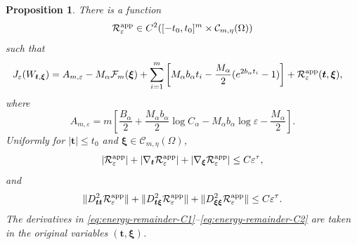 \documentclass[11pt]{article}
\newtheorem{proposition}[theorem]{Proposition}
\numberwithin{equation}{section}
\begin{document}
\begin{proposition}\label{prop:energy-expansion}
There is a function
\[
\mathcal R_\varepsilon^{\rm app}
\in C^2([-t_0,t_0]^m\times\mathcal C_{m,\eta}(\Omega))
\]
such that
\begin{equation}\label{eq:energy-expansion}
\begin{aligned}
J_\varepsilon(W_{\boldsymbol t,\boldsymbol\xi})
={}&A_{m,\varepsilon}-M_\alpha\mathcal F_m(\boldsymbol\xi)+\sum_{i=1}^{m}\left[
M_\alpha b_\alpha t_i
-\frac{M_\alpha}{2}(e^{2b_\alpha t_i}-1)
\right]
+\mathcal R_\varepsilon^{\rm app}(\boldsymbol t,\boldsymbol\xi),
\end{aligned}
\end{equation}
where
\begin{equation}\label{eq:energy-constant}
A_{m,\varepsilon}
=m\left[
\frac{B_\alpha}{2}
+\frac{M_\alpha b_\alpha}{2}\log C_\alpha
-M_\alpha b_\alpha\log\varepsilon
-\frac{M_\alpha}{2}
\right].
\end{equation}
Uniformly for $|\boldsymbol t|\leq t_0$ and
$\boldsymbol\xi\in\mathcal C_{m,\eta}(\Omega)$,
\begin{equation}\label{eq:energy-remainder-C1}
|\mathcal R_\varepsilon^{\rm app}|
+|\nabla_{\boldsymbol t}\mathcal R_\varepsilon^{\rm app}|
+|\nabla_{\boldsymbol\xi}\mathcal R_\varepsilon^{\rm app}|
\leq C\varepsilon^\tau,
\end{equation}
and
\begin{equation}\label{eq:energy-remainder-C2}
\|D_{\boldsymbol t\boldsymbol t}^2
\mathcal R_\varepsilon^{\rm app}\|
+\|D_{\boldsymbol t\boldsymbol\xi}^2
\mathcal R_\varepsilon^{\rm app}\|
+\|D_{\boldsymbol\xi\boldsymbol\xi}^2
\mathcal R_\varepsilon^{\rm app}\|
\leq C\varepsilon^\tau.
\end{equation}
The derivatives in \eqref{eq:energy-remainder-C1}--\eqref{eq:energy-remainder-C2}
are taken in the original variables
$(\boldsymbol t,\boldsymbol\xi)$.
\end{proposition}
\end{document}

